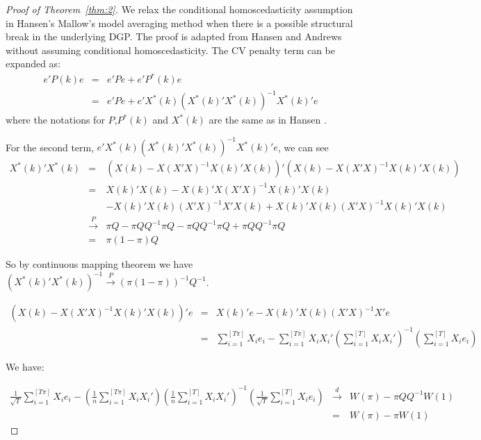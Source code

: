 \documentclass[a4paper,12pt]{article}
\newcommand{\jia}{\sum_{i=1}^{[T \pi]}}
\newcommand{\jian}{\sum_{i=1}^{[T]}}
\newcommand{\rn}{\frac{1}{\sqrt{T}}}
\begin{document}
\begin{proof}[Proof of Theorem~\ref{thm:2}]
We relax the conditional homoscedasticity assumption in Hansen's Mallow's model averaging method when there is a possible structural break in the underlying DGP. The proof is adapted from Hansen \cite{hansen2009averaging} and Andrews \cite{andrews93} without assuming conditional homoscedasticity. The CV penalty term can be expanded as:
\begin{eqnarray*}
e'P(k)e & = & e'Pe + e'P^{*}(k)e \\
        & = & e'Pe + e'X^{*}(k)(X^{*}(k)'X^{*}(k))^{-1}X^{*}(k)'e
\end{eqnarray*}
where the notations for $P$,$P^{*}(k)$ and $X^{*}(k)$ are the same as in Hansen \cite{hansen2009averaging}.

For the second term, $e'X^{*}(k)(X^{*}(k)'X^{*}(k))^{-1}X^{*}(k)'e$, we can see
\begin{eqnarray*}
X^{*}(k)'X^{*}(k) & = & (X(k)-X(X'X)^{-1}X(k)'X(k))'(X(k)-X(X'X)^{-1}X(k)'X(k)) \\
                  & = & X(k)'X(k) - X(k)'X(X'X)^{-1}X(k)'X(k) \\
				  &   & - X(k)'X(k)(X'X)^{-1}X'X(k) + X(k)'X(k)(X'X)^{-1}X(k)'X(k) \\
				  & \stackrel{P}{\rightarrow} & \pi Q - \pi QQ^{-1} \pi Q - \pi QQ^{-1} \pi Q + \pi QQ^{-1} \pi Q \\
				  & = & \pi (1-\pi)Q
\end{eqnarray*}

So by continuous mapping theorem we have $(X^{*}(k)'X^{*}(k))^{-1}\stackrel{P}{\rightarrow}(\pi (1-\pi))^{-1}Q^{-1}$.

\begin{eqnarray*}
(X(k) - X(X'X)^{-1}X(k)'X(k))'e & = & X(k)'e - X(k)'X(k)(X'X)^{-1}X'e \\
                                & = & \jia X_i e_i - \jia X_i X_i'(\jian X_i X_i')^{-1}(\jian X_i e_i)
\end{eqnarray*}

We have:

\begin{eqnarray*}
\rn \jia X_i e_i - (\frac{1}{n} \jia X_i X_i')(\frac{1}{n} \jian X_i X_i')^{-1}(\rn \jian X_i e_i) & \stackrel{d}{\rightarrow} & W(\pi) - \pi Q Q^{-1}W(1) \\
                                                                                                   & =                         & W(\pi) - \pi W(1)
\end{eqnarray*}


\end{proof}
\end{document}
